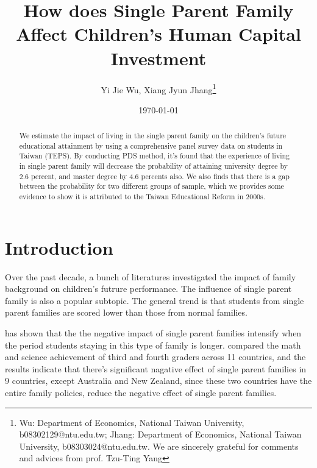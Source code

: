 \documentclass[]{AEA}
\begin{document}
\title{How does Single Parent Family Affect Children's Human Capital Investment}
\author{Yi Jie Wu, Xiang Jyun Jhang\thanks{Wu: Department of Economics, National Taiwan University, b08302129@ntu.edu.tw; Jhang: Department of Economics, National Taiwan University, b08303024@ntu.edu.tw.  We are sincerely grateful for comments and advices from prof. Tzu-Ting Yang}}
\date{\today}

\begin{abstract}
    We estimate the impact of living in the single parent family on the children's future educational attainment by using a comprehensive panel survey data on students in Taiwan (TEPS).  By conducting PDS method, it's found that the experience of living in single parent family will decrease the probability of attaining university degree by 2.6 percent, and master degree by 4.6 percents also.  We also finds that there is a gap between the probability for two different groups of sample, which we provides some evidence to show it is attributed to the Taiwan Educational Reform in 2000s.
\end{abstract}


\maketitle

\section{Introduction}

    Over the past decade, a bunch of literatures investigated the impact of family background on children's futrure performance. The influence of single parent family is also a popular subtopic. The general trend is that students from single parent families are scored lower than those from normal families.\cite{barajas2011} 

    \cite{krein1988} has shown that the the negative impact of single parent families intensify when the period students staying in this type of family is longer. \cite{pong2003} compared the math and science achievement of third and fourth graders across 11 countries, and the results indicate that there's significant nagative effect of single parent families in 9 countries, except Australia and New Zealand, since these two countries have the entire family policies, reduce the negative effect of single parent families.
\end{document}

